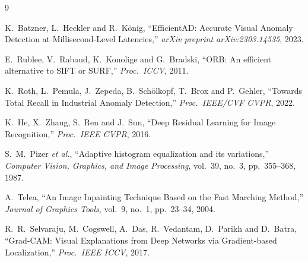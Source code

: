 \documentclass[11pt,a4paper,draft]{article}
\begin{document}
\begin{thebibliography}{9}

K.~Batzner, L.~Heckler and R.~K\"onig, ``EfficientAD: Accurate Visual Anomaly Detection at Millisecond-Level Latencies,'' \textit{arXiv preprint arXiv:2303.14535}, 2023.

E.~Rublee, V.~Rabaud, K.~Konolige and G.~Bradski, ``ORB: An efficient alternative to SIFT or SURF,'' \textit{Proc.\ ICCV}, 2011.

K.~Roth, L.~Pemula, J.~Zepeda, B.~Sch\"olkopf, T.~Brox and P.~Gehler, ``Towards Total Recall in Industrial Anomaly Detection,'' \textit{Proc.\ IEEE/CVF CVPR}, 2022.

K.~He, X.~Zhang, S.~Ren and J.~Sun, ``Deep Residual Learning for Image Recognition,'' \textit{Proc.\ IEEE CVPR}, 2016.

S.~M.~Pizer \textit{et al.}, ``Adaptive histogram equalization and its variations,'' \textit{Computer Vision, Graphics, and Image Processing}, vol.~39, no.~3, pp.~355--368, 1987.

A.~Telea, ``An Image Inpainting Technique Based on the Fast Marching Method,'' \textit{Journal of Graphics Tools}, vol.~9, no.~1, pp.~23--34, 2004.

R.~R.~Selvaraju, M.~Cogswell, A.~Das, R.~Vedantam, D.~Parikh and D.~Batra, ``Grad-CAM: Visual Explanations from Deep Networks via Gradient-based Localization,'' \textit{Proc.\ IEEE ICCV}, 2017.

\end{thebibliography}
\end{document}
